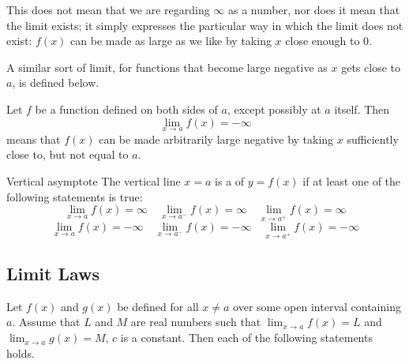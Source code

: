 \begin{remark}
This does not mean that we are regarding $\infty$ as a number, nor does it mean that the limit
exists; it simply expresses the particular way in which the limit does not exist: $f(x)$ can be made as large as we like by taking $x$ close enough to 0.
\end{remark}

A similar sort of limit, for functions that become large negative as $x$ gets close to $a$, is defined below.

\begin{defn}{}{}
Let $f$ be a function defined on both sides of $a$, except possibly at $a$ itself. Then
\[ \lim_{x\to a}f(x)=-\infty \]
means that $f(x)$ can be made arbitrarily large negative by taking $x$ sufficiently close to, but not equal to $a$.
\end{defn}

\begin{defn}{Vertical asymptote}{}
The vertical line $x=a$ is a  of $y=f(x)$ if at least one of the following statements is true:
\[ \lim_{x\to a}f(x)=\infty \quad \lim_{x\to a^-}f(x)=\infty \quad \lim_{x\to a^+}f(x)=\infty \]
\[ \lim_{x\to a}f(x)=-\infty \quad \lim_{x\to a^-}f(x)=-\infty \quad \lim_{x\to a^+}f(x)=-\infty \]
\end{defn}

\subsection{Limit Laws}
Let $f(x)$ and $g(x)$ be defined for all $x\neq a$ over some open interval containing $a$. Assume that $L$ and $M$ are real numbers such that $\lim_{x\to a}f(x)=L$ and $\lim_{x\to a}g(x)=M$, $c$ is a constant. Then each of the following statements holds.

